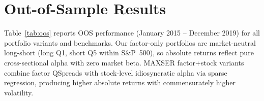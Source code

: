 \documentclass[12pt,a4paper]{article}
\begin{document}
\section{Out-of-Sample Results}
\label{sec:results}

Table~\ref{tab:oos} reports OOS performance (January 2015 -- December 2019) for all portfolio variants and benchmarks. Our factor-only portfolios are market-neutral long-short (long Q1, short Q5 within S\&P~500), so absolute returns reflect pure cross-sectional alpha with zero market beta. MAXSER factor+stock variants combine factor QSpreads with stock-level idiosyncratic alpha via sparse regression, producing higher absolute returns with commensurately higher volatility.
\end{document}
